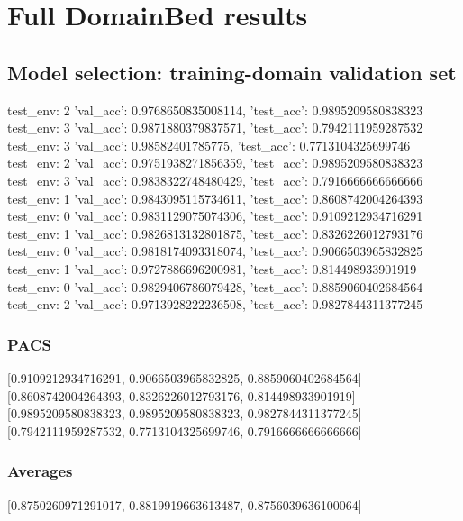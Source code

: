 \documentclass{article}
\begin{document}
\section{Full DomainBed results}

\subsection{Model selection: training-domain validation set}
test_env: 2
{'val_acc': 0.9768650835008114, 'test_acc': 0.9895209580838323}
test_env: 3
{'val_acc': 0.9871880379837571, 'test_acc': 0.7942111959287532}
test_env: 3
{'val_acc': 0.98582401785775, 'test_acc': 0.7713104325699746}
test_env: 2
{'val_acc': 0.9751938271856359, 'test_acc': 0.9895209580838323}
test_env: 3
{'val_acc': 0.9838322748480429, 'test_acc': 0.7916666666666666}
test_env: 1
{'val_acc': 0.9843095115734611, 'test_acc': 0.8608742004264393}
test_env: 0
{'val_acc': 0.9831129075074306, 'test_acc': 0.9109212934716291}
test_env: 1
{'val_acc': 0.9826813132801875, 'test_acc': 0.8326226012793176}
test_env: 0
{'val_acc': 0.9818174093318074, 'test_acc': 0.9066503965832825}
test_env: 1
{'val_acc': 0.9727886696200981, 'test_acc': 0.814498933901919}
test_env: 0
{'val_acc': 0.9829406786079428, 'test_acc': 0.8859060402684564}
test_env: 2
{'val_acc': 0.9713928222236508, 'test_acc': 0.9827844311377245}

\subsubsection{PACS}
[0.9109212934716291, 0.9066503965832825, 0.8859060402684564]
[0.8608742004264393, 0.8326226012793176, 0.814498933901919]
[0.9895209580838323, 0.9895209580838323, 0.9827844311377245]
[0.7942111959287532, 0.7713104325699746, 0.7916666666666666]

\begin{center}
\end{center}

\subsubsection{Averages}
[0.8750260971291017, 0.8819919663613487, 0.8756039636100064]

\begin{center}
\end{center}
\end{document}

